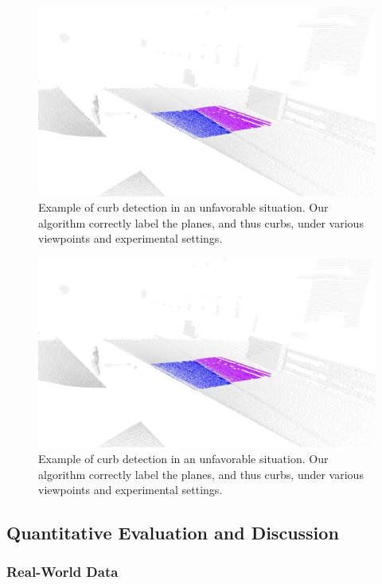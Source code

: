 \begin{figure}[t]
\centering
\includegraphics[width=\columnwidth]{fig/special.eps}
\caption{Example of curb detection in an unfavorable situation. Our algorithm
correctly label the planes, and thus curbs, under various viewpoints and
experimental settings.}
\label{fig:ml}
\end{figure}

\begin{figure}[t]
\centering
\includegraphics[width=\columnwidth]{fig/special.eps}
\caption{Example of curb detection in an unfavorable situation. Our algorithm
correctly label the planes, and thus curbs, under various viewpoints and
experimental settings.}
\label{fig:crf-em}
\end{figure}

\subsection{Quantitative Evaluation and Discussion}

\subsubsection{Real-World Data}

